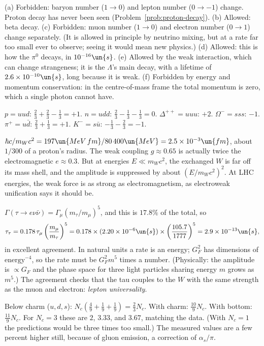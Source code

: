 
 (a) Forbidden: baryon number ($1\to0$) and lepton number ($0\to-1$) change. Proton decay has never been seen (Problem~\ref{prob:proton-decay}). (b) Allowed: beta decay. (c) Forbidden: muon number ($1\to0$) and electron number ($0\to1$) change separately. (It is allowed in principle by neutrino mixing, but at a rate far too small ever to observe; seeing it would mean new physics.) (d) Allowed: this is how the $\pi^0$ decays, in $10^{-16}\un{s}$. (e) Allowed by the weak interaction, which can change strangeness; it is the $\Lambda$'s main decay, with a lifetime of $2.6\times10^{-10}\un{s}$, long because it is weak. (f) Forbidden by energy and momentum conservation: in the centre-of-mass frame the total momentum is zero, which a single photon cannot have.

 $p = uud$: $\tfrac23+\tfrac23-\tfrac13 = +1$. $n = udd$: $\tfrac23-\tfrac13-\tfrac13 = 0$. $\Delta^{++} = uuu$: $+2$. $\Omega^- = sss$: $-1$. $\pi^+ = u\bar d$: $\tfrac23+\tfrac13 = +1$. $K^- = s\bar u$: $-\tfrac13-\tfrac23 = -1$.

 $\hbar c/m_Wc^2 = 197\un{MeV\,fm}/80\,400\un{MeV} = 2.5\times10^{-3}\un{fm}$, about $1/300$ of a proton's radius. The weak coupling $g\approx0.65$ is actually twice the electromagnetic $e\approx0.3$. But at energies $E\ll m_Wc^2$, the exchanged $W$ is far off its mass shell, and the amplitude is suppressed by about $(E/m_Wc^2)^2$. At LHC energies, the weak force is as strong as electromagnetism, as electroweak unification says it should be.

 $\Gamma(\tau\to e\nu\bar\nu) = \Gamma_\mu(m_\tau/m_\mu)^5$, and this is $17.8\%$ of the total, so
\[
  \tau_\tau = 0.178\,\tau_\mu\left(\frac{m_\mu}{m_\tau}\right)^5 = 0.178\times(2.20\times10^{-6}\un{s})\times\left(\frac{105.7}{1777}\right)^5 = 2.9\times10^{-13}\un{s},
\]
in excellent agreement. In natural units a rate is an energy; $G_F^2$ has dimensions of $\text{energy}^{-4}$, so the rate must be $G_F^2m^5$ times a number. (Physically: the amplitude is $\propto G_F$ and the phase space for three light particles sharing energy $m$ grows as $m^5$.) The agreement checks that the tau couples to the $W$ with the same strength as the muon and electron: \emph{lepton universality}.

 Below charm ($u,d,s$): $N_c(\tfrac49+\tfrac19+\tfrac19) = \tfrac23N_c$. With charm: $\tfrac{10}{9}N_c$. With bottom: $\tfrac{11}{9}N_c$. For $N_c = 3$ these are $2$, $3.33$, and $3.67$, matching the data. (With $N_c = 1$ the predictions would be three times too small.) The measured values are a few percent higher still, because of gluon emission, a correction of $\alpha_s/\pi$.

